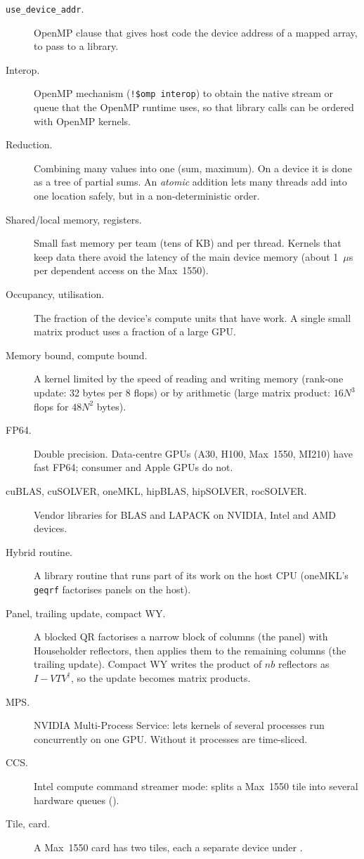\begin{description}
\item[\texttt{use\_device\_addr}.] OpenMP clause that gives host code the device address of a mapped array, to pass to a library.
\item[Interop.] OpenMP mechanism (\texttt{!\$omp interop}) to obtain the native stream or queue that the OpenMP runtime uses, so that library calls can be ordered with OpenMP kernels.
\item[Reduction.] Combining many values into one (sum, maximum). On a device it is done as a tree of partial sums. An \emph{atomic} addition lets many threads add into one location safely, but in a non-deterministic order.
\item[Shared/local memory, registers.] Small fast memory per team (tens of KB) and per thread. Kernels that keep data there avoid the latency of the main device memory (about 1~$\mu$s per dependent access on the Max~1550).
\item[Occupancy, utilisation.] The fraction of the device's compute units that have work. A single small matrix product uses a fraction of a large GPU.
\item[Memory bound, compute bound.] A kernel limited by the speed of reading and writing memory (rank-one update: 32 bytes per 8 flops) or by arithmetic (large matrix product: $16N^3$ flops for $48N^2$ bytes).
\item[FP64.] Double precision. Data-centre GPUs (A30, H100, Max~1550, MI210) have fast FP64; consumer and Apple GPUs do not.
\item[cuBLAS, cuSOLVER, oneMKL, hipBLAS, hipSOLVER, rocSOLVER.] Vendor libraries for BLAS and LAPACK on NVIDIA, Intel and AMD devices.
\item[Hybrid routine.] A library routine that runs part of its work on the host CPU (oneMKL's \texttt{geqrf} factorises panels on the host).
\item[Panel, trailing update, compact WY.] A blocked QR factorises a narrow block of columns (the panel) with Householder reflectors, then applies them to the remaining columns (the trailing update). Compact WY writes the product of $nb$ reflectors as $I-VTV^\dagger$, so the update becomes matrix products.
\item[MPS.] NVIDIA Multi-Process Service: lets kernels of several processes run concurrently on one GPU. Without it processes are time-sliced.
\item[CCS.] Intel compute command streamer mode: splits a Max~1550 tile into several hardware queues ().
\item[Tile, card.] A Max~1550 card has two tiles, each a separate device under .

\end{description}
